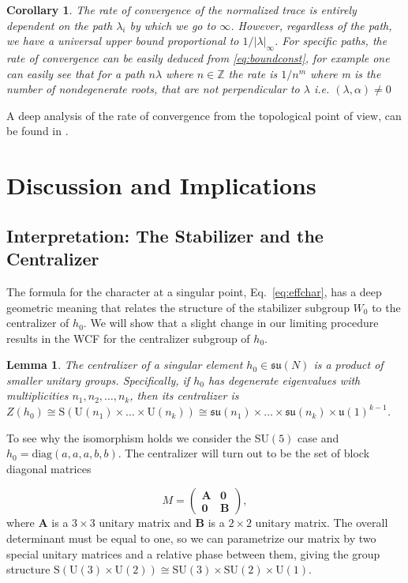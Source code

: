 \documentclass[11pt, a4paper]{article}
\newcommand{\su}{\mathfrak{su}}
\newtheorem{lemma}[theorem]{Lemma}
\newtheorem{corollary}[theorem]{Corollary}
\theoremstyle{definition}
\theoremstyle{remark}
\begin{document}
\begin{corollary}
    The rate of convergence of the normalized trace is entirely dependent on the path $\lambda_i$ by which we go to $\infty$. However, regardless of the path, we have a universal upper bound proportional to $1/|\lambda|_{\infty}$. For specific paths, the rate of convergence can be easily deduced from \ref{eq:boundconst}, for example one can easily see that for a path $n\lambda$ where $n\in \mathbb{Z}$ the rate is $1/n^m$ where m is the number of nondegenerate roots, that are not perpendicular to $\lambda$ i.e. $(\lambda,\alpha)\neq0$
\end{corollary}


A deep analysis of the rate of convergence from the topological point of view, can be found in \cite{etingof2025boundsasymptoticcharacterssimple}.

\section{Discussion and Implications}
\label{sec:discussion}

 
\subsection{Interpretation: The Stabilizer and the Centralizer}

The formula for the character at a singular point, Eq.~\eqref{eq:effchar}, has a deep geometric meaning that relates the structure of the stabilizer subgroup $W_0$ to the centralizer of $h_0$. We will show that a slight change in our limiting procedure results in the WCF for the centralizer subgroup of $h_0$.

\begin{lemma}
The centralizer of a singular element $h_0 \in \su(N)$ is a product of smaller unitary groups. Specifically, if $h_0$ has degenerate eigenvalues with multiplicities $n_1, n_2, \dots, n_k$, then its centralizer is $Z(h_0) \cong \mathrm{S}(\mathrm{U}(n_1) \times \dots \times \mathrm{U}(n_k)) \cong \su(n_1) \times \dots \times \su(n_k) \times \mathfrak{u}(1)^{k-1}$.
\end{lemma}

To see why the isomorphism holds we consider the SU$(5)$ case and $h_0=\text{diag}(a,a,a,b,b)$. The centralizer will turn out to be the set of block diagonal matrices 

\[
  M =
  \begin{pmatrix}
    \mathbf{A} & \mathbf{0} \\
    \mathbf{0} & \mathbf{B}
  \end{pmatrix},
\]
where $\mathbf{A}$ is a $3 \times 3$ unitary matrix and $\mathbf{B}$ is a $2 \times 2$ unitary matrix. The overall determinant must be equal to one, so we can parametrize our matrix by two special unitary matrices and a relative phase between them, giving the group structure $\mathrm{S(U(3) \times U(2))} \cong \mathrm{SU}(3) \times \mathrm{SU}(2) \times \mathrm{U}(1)$. 
\end{document}
